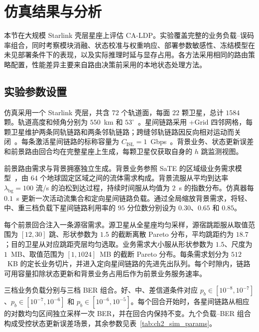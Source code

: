 \section{仿真结果与分析}
\label{sec:ch2_experiments}

本节在大规模 Starlink 壳层星座上评估 CA-LDP。实验覆盖完整的业务负载--误码率组合，同时考察模块消融、状态校准与权重响应、部署参数敏感性、冻结模型在未见部署条件下的表现，以及实际推理时延与显存占用。各方法采用相同的路由策略配置，性能差异主要来自路由决策前采用的本地状态处理方法。

\subsection{实验参数设置}
\label{subsec:ch2_exp_setup}

仿真采用一个 Starlink 壳层，共含 $72$ 个轨道面，每面 $22$ 颗卫星，总计 $1584$ 颗。轨道高度和倾角分别为 $550$~km 和 $53^\circ$~\cite{lai-StarryNet-NSDI23,chen-AnalysisISLLEO-TVT21}。星间链路采用 +Grid 四邻网格，每颗卫星维护两条同轨链路和两条邻轨链路；跨缝邻轨链路因反向相对运动而关闭~\cite{chen-AnalysisISLLEO-TVT21,Bhattacherjee-Singla-NetworkTopologyDesign-CCS19}。每条激活星间链路的标称容量为 $C_{\mathrm{ISL}}=1$~Gbps~\cite{Gioulis-OpticalISLModel-Photonics25}。背景业务、状态更新误差和前景路由回合均在完整星座上生成，每颗卫星仅获取自身的 $h$ 跳监测视图。

前景路由需求与背景拥塞独立生成。背景业务参照 SaTE 的区域级业务需求模型~\cite{wuhao-SaTE-SIGCOMM25}，由 $64$ 个地球固定区域之间的流体需求构成。背景流服从平均到达率 $\lambda_{\mathrm{bg}}=100$ 流/s 的泊松到达过程，持续时间服从均值为 $2$~s 的指数分布。仿真器每 $0.1$~s 更新一次活动流集合和定向星间链路负载。通过全局缩放背景需求，将轻、中、重三档负载下星间链路利用率的 $95$ 分位数分别设为 $0.30$、$0.65$ 和 $0.85$。

每个前景回合注入一条源宿需求。源卫星从全星座均匀采样，源宿跳距服从取值范围为 $[12,30]$ 跳、形状参数为 $1.5$ 的截断离散 Pareto 分布，平均跳距约为 $18.7$；目的卫星从对应跳距壳层均匀选取。业务需求大小服从形状参数为 $1.5$、尺度为 $1$~MB、取值范围为 $[1,1024]$~MB 的截断 Pareto 分布。每条需求划分为 $512$~KB 的定长业务切片，并进入定向星间链路的先进先出队列。每个时隙内，链路可用容量扣除状态更新和背景业务占用后作为前景业务服务速率。

三档业务负载分别与三档 BER 组合。好、中、差信道条件对应 $p_b\in[10^{-8},10^{-7}]$、$p_b\in[10^{-7},10^{-6}]$ 和 $p_b\in[10^{-6},10^{-5}]$。每个回合开始时，各星间链路从相应的对数均匀区间独立采样一次 BER，并在回合内保持不变。九个负载--BER 组合构成受控状态更新误差场景，其余参数见表~\ref{tab:ch2_sim_params}。

